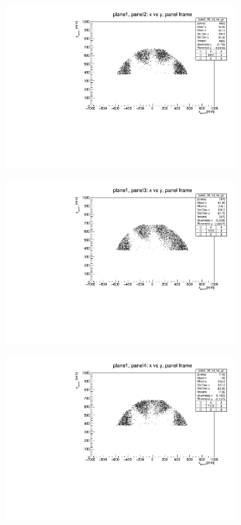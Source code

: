 \begin{figure}[!h]
\begin{subfigure}[b]{0.4\textwidth}
        \includegraphics[width=0.95\textwidth]{figures/pdf/plane1_panel2_x_vs_y_all.pdf}
        \label{fig:panel2plane1}
    \end{subfigure}
    \hfill
    \begin{subfigure}[b]{0.4\textwidth}
        \centering
        \includegraphics[width=0.95\textwidth]{figures/pdf/plane1_panel3_x_vs_y_all.pdf}
        \label{fig:panel3plane1}
    \end{subfigure}
    \hfill
    \begin{subfigure}[b]{0.4\textwidth}
        \centering
        \includegraphics[width=0.95\textwidth]{figures/pdf/plane1_panel4_x_vs_y_all.pdf}

\end{subfigure}
\end{figure}
